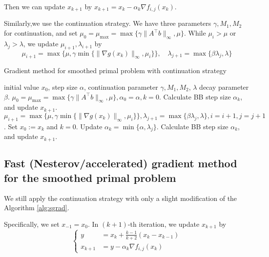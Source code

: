 \documentclass{article}
\numberwithin{equation}{section}
\numberwithin{figure}{section}
\begin{document}
Then we can update $x_{k+1}$ by $x_{k+1}=x_k-\alpha_k\nabla f_{i,j}(x_k)$.

Similarly,we use the continuation strategy. We have three parameters $\gamma, M_1,M_2$ for continuation, and set $\mu_0=\mu_{\max}=\max\{\gamma\|A^\top b\|_\infty,\mu\}$. While $\mu_i>\mu$ or $\lambda_j>\lambda$, we update $\mu_{i+1},\lambda_{i+1}$ by
\begin{equation}
\mu_{i+1}=\max\{\mu, \gamma\min\{\|\nabla g(x_k)\|_\infty, \mu_i\} \}, \quad \lambda_{j+1}=\max\{\beta\lambda_j,\lambda\}
\end{equation}

\begin{algorithm}[!htbp]\caption{Gradient method for smoothed primal problem with continuation strategy}\label{alg:sgrad}
\begin{algorithmic}[1]
 initial value $x_0$, step size $\alpha$, continuation parameter $\gamma, M_1, M_2$, $\lambda$ decay parameter $\beta$.
\STATE $\mu_0=\mu_{\max}=\max\{\gamma\|A^\top b\|_\infty,\mu\},\alpha_0=\alpha, k=0$.
\STATE Calculate BB step size $\alpha_k$, and update $x_{k+1}$.
\ENDFOR
\STATE $\mu_{i+1}=\max\{\mu, \gamma\min\{\|\nabla g(x_k)\|_\infty, \mu_i\} \},  \lambda_{j+1}=\max\{\beta\lambda_j,\lambda\}, i = i+1, j = j+1
$.
\STATE Set $x_0 := x_k$ and $k=0$. Update $\alpha_k=\min\{\alpha,\lambda_j\}$.
\ENDWHILE
{}
\STATE Calculate BB step size $\alpha_k$, and update $x_{k+1}$.
\ENDFOR
\end{algorithmic}
\end{algorithm}



\subsection{Fast (Nesterov/accelerated) gradient method for the smoothed primal problem}
We still apply the continuation strategy with only a slight modification of the Algorithm \ref{alg:sgrad}. 

Specifically, we set $x_{-1}=x_0$. In $(k+1)$-th iteration, we update $x_{k+1}$ by
\begin{equation}
    \begin{cases}
    y &= x_k+\frac{k-1}{k+2}(x_k-x_{k-1})\\
    x_{k+1} &=y-\alpha_k\nabla f_{i,j}(x_k)
    \end{cases}\label{eq:fsgrad}
\end{equation}
\end{document}
